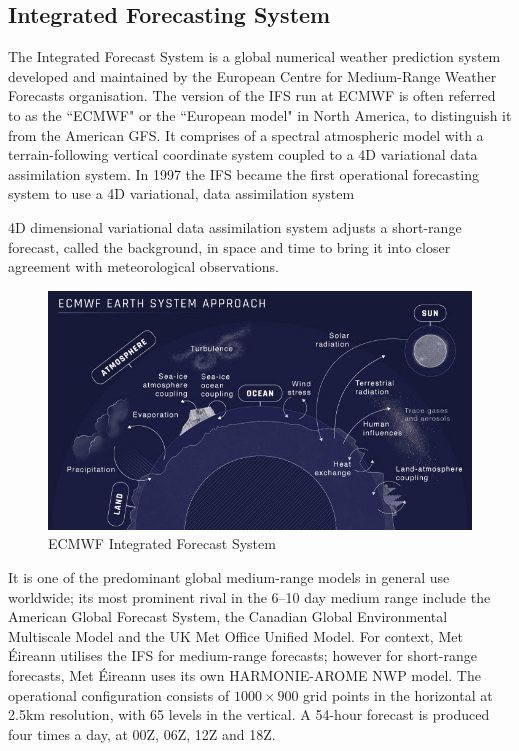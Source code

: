\subsection{Integrated Forecasting System}\label{ifs_section}
The Integrated Forecast System is a global numerical weather prediction system developed and maintained by the European Centre for Medium-Range Weather Forecasts organisation. The version of the IFS run at ECMWF is often referred to as the ``ECMWF" or the ``European model" in North America, to distinguish it from the American GFS. It comprises of a spectral atmospheric model with a terrain-following vertical coordinate system coupled to a 4D variational data assimilation system. In 1997 the IFS became the first operational forecasting system to use a 4D variational, data assimilation system

\begin{definition}
4D dimensional variational data assimilation system adjusts a short-range forecast, called the background, in space and time to bring it into closer agreement with meteorological observations.
\end{definition}

\begin{figure}[H]
    \centering
    \includegraphics[width=.8\linewidth]{Images/ifs.jpg}
    \caption{ECMWF Integrated Forecast System}
\end{figure}

It is one of the predominant global medium-range models in general use worldwide; its most prominent rival in the 6–10 day medium range include the American Global Forecast System, the Canadian Global Environmental Multiscale Model and the UK Met Office Unified Model. For context, Met Éireann utilises the IFS for medium-range forecasts; however for short-range forecasts, Met Éireann uses its own HARMONIE-AROME NWP model. The operational configuration consists of $1000 \times 900$ grid points in the horizontal at 2.5km resolution, with 65 levels in the vertical. A 54-hour forecast is produced four times a day, at 00Z, 06Z, 12Z and 18Z\cite{harmonie_arome_nwp}. 

